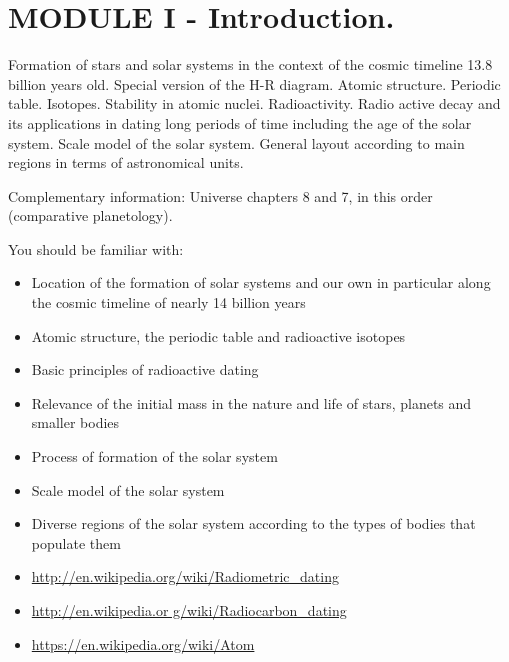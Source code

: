 \section{MODULE I - Introduction.}

Formation of stars and solar systems in the context of the cosmic timeline 13.8 billion years old. Special version of the H-R diagram. Atomic structure. Periodic table. Isotopes. Stability in atomic nuclei. Radioactivity. Radio active decay and its applications in dating long periods of time including the age of the solar system. Scale model of the solar system. General layout according to main regions in terms of astronomical units.

Complementary information: Universe chapters 8 and 7, in this order (comparative planetology).

You should be familiar with:

\begin{itemize}
\item Location of the formation of solar systems and our own in particular along the cosmic timeline of nearly 14 billion years
\item Atomic structure, the periodic table and radioactive isotopes
\item Basic principles of radioactive dating
\item Relevance of the initial mass in the nature and life of stars, planets and smaller bodies
\item Process of formation of the solar system
\item Scale model of the solar system
\item Diverse regions of the solar system according to the types of bodies that populate them
\item \url{http://en.wikipedia.org/wiki/Radiometric_dating}
\item \url{http://en.wikipedia.or g/wiki/Radiocarbon_dating}
\item \url{https://en.wikipedia.org/wiki/Atom}
\end{itemize}